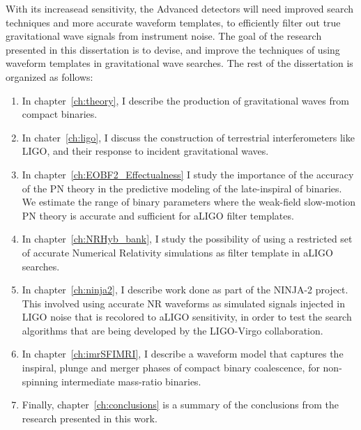 With its increasead sensitivity, the Advanced detectors will need improved
search techniques and more accurate waveform templates, to efficiently
filter out true gravitational wave signals from instrument noise. 
The goal of the research presented in this dissertation is to devise, and
improve the techniques of using waveform templates in gravitational wave searches. 
The rest of the dissertation is organized as follows:
\begin{enumerate}
 \item In chapter~\ref{ch:theory}, I describe the production of gravitational
 waves from compact binaries. %
 \item In chater~\ref{ch:ligo}, I discuss the construction of terrestrial 
 interferometers like LIGO, and their response to incident gravitational waves.
 \item In chapter~\ref{ch:EOBF2_Effectualness} 
 I study the importance of the accuracy of the PN theory in the predictive 
 modeling of the late-inspiral of binaries. We estimate the range of binary 
 parameters where the weak-field slow-motion PN theory is accurate and 
 sufficient for aLIGO filter templates.
 \item In chapter~\ref{ch:NRHyb_bank}, I study the possibility of using a
 restricted set of accurate Numerical Relativity simulations as filter template
 in aLIGO searches. 
 \item In chapter~\ref{ch:ninja2}, I describe work done as part of the 
 NINJA-2 project. This involved using accurate NR waveforms as simulated
 signals injected in LIGO noise that is recolored to aLIGO sensitivity, in
 order to test the search algorithms that are being developed by the
 LIGO-Virgo collaboration.
 \item In chapter~\ref{ch:imrSFIMRI}, I describe a waveform model that 
 captures the inspiral, plunge and merger phases of compact binary 
 coalescence, for non-spinning intermediate mass-ratio binaries.
 \item Finally, chapter~\ref{ch:conclusions} is a summary of the conclusions
 from the research presented in this work.
\end{enumerate}





